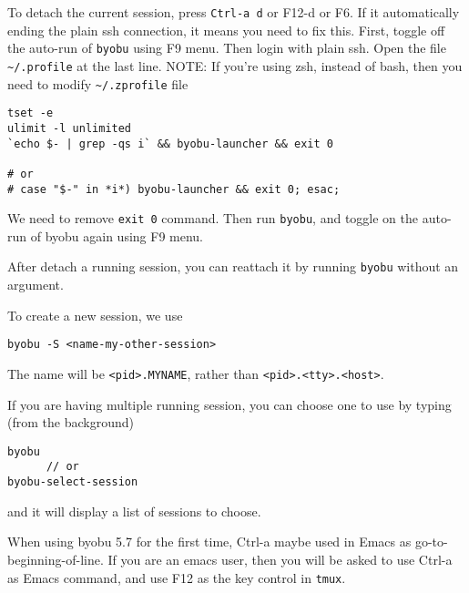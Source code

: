 To detach the current session, press \verb!Ctrl-a d! or F12-d or F6. If it
automatically ending the plain ssh connection, it means you need to fix this.
First, toggle off the auto-run of \verb!byobu! using F9 menu. Then login with
plain ssh. Open the file \verb!~/.profile! at the last line. NOTE: If you're
using zsh, instead of bash, then you need to modify \verb!~/.zprofile! file
\begin{verbatim}
tset -e                                                                                                                                                                                                               
ulimit -l unlimited
`echo $- | grep -qs i` && byobu-launcher && exit 0

# or
# case "$-" in *i*) byobu-launcher && exit 0; esac;
\end{verbatim}
We need to remove \verb!exit 0! command. Then run \verb!byobu!, and toggle on
the auto-run of byobu again using F9 menu.

After detach a running session, you can reattach it by running \verb!byobu!
without an argument.

To create a new session, we use
\begin{verbatim}
byobu -S <name-my-other-session>
\end{verbatim}
The name will be \verb!<pid>.MYNAME!, rather than \verb!<pid>.<tty>.<host>!. 

If you are having multiple running session, you can choose one to use by typing
(from the background)
\begin{verbatim}
byobu
      // or
byobu-select-session
\end{verbatim}
and it will display a list of sessions to choose.


\begin{framed}

When using byobu 5.7 for the first time, Ctrl-a maybe used in Emacs as
go-to-beginning-of-line. If you are an emacs user, then you will be asked to use
Ctrl-a as Emacs command, and use F12 as the key control in \verb!tmux!.
\end{framed}


